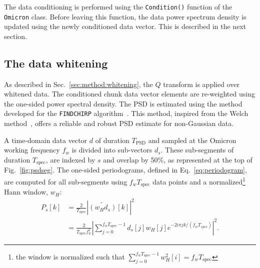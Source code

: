 The data conditioning is performed using the \texttt{Condition()} function of the \texttt{Omicron} class. Before leaving this function, the data power spectrum density is updated using the newly conditioned data vector. This is described in the next section. 


\subsection{The data whitening} \label{sec:algorithm:whitening}

As described in Sec.~\ref{sec:method:whitening}, the $Q$ transform is applied over whitened data. The conditioned chunk data vector elements are re-weighted using the one-sided power spectral density. The PSD is estimated using the method developed for the \texttt{FINDCHIRP} algorithm~\cite{Allen:2005fk}. This method, inspired from the Welch method~\cite{Welch:1967}, offers a reliable and robust PSD estimate for non-Gaussian data.

A time-domain data vector $d$ of duration $T_\mathrm{PSD}$ and sampled at the Omicron working frequency $f_w$ is divided into sub-vectors $d_s$. These sub-segments of duration $T_\mathrm{spec}$, are indexed by $s$ and overlap by 50\%, as represented at the top of Fig.~\ref{fig:psdseg}. The one-sided periodograms, defined in Eq.~\ref{eq:periodogram}, are computed for all sub-segments using $f_wT_\mathrm{spec}$ data points and a normalized\footnote{the window is normalized such that $\sum_{j=0}^{f_wT_\mathrm{spec}-1}{w_H^2[i]} = f_wT_\mathrm{spec}$} Hann window, $w_H$:
\begin{align}
  P_s[k] &= \frac{2}{T_\mathrm{spec}}\left|\widetilde{(w_Hd_s)}[k]\right|^2 \\
  &= \frac{2}{T_\mathrm{spec}f_w^2}\left|\sum_{j=0}^{f_wT_\mathrm{spec}-1}{d_s[j]w_H[j]e^{-2i\pi jk/(f_wT_{spec})}}\right|^2.
\end{align}

